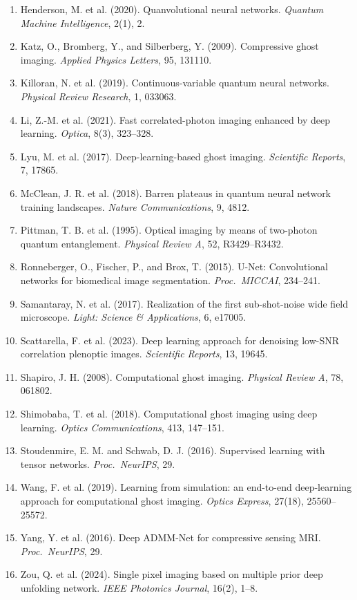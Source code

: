 \documentclass[12pt,a4paper]{article}
\begin{document}
\begin{enumerate}
    \item Henderson, M. et al. (2020). Quanvolutional neural networks. \textit{Quantum Machine Intelligence}, 2(1), 2.
    \item Katz, O., Bromberg, Y., and Silberberg, Y. (2009). Compressive ghost imaging. \textit{Applied Physics Letters}, 95, 131110.
    \item Killoran, N. et al. (2019). Continuous-variable quantum neural networks. \textit{Physical Review Research}, 1, 033063.
    \item Li, Z.-M. et al. (2021). Fast correlated-photon imaging enhanced by deep learning. \textit{Optica}, 8(3), 323--328.
    \item Lyu, M. et al. (2017). Deep-learning-based ghost imaging. \textit{Scientific Reports}, 7, 17865.
    \item McClean, J. R. et al. (2018). Barren plateaus in quantum neural network training landscapes. \textit{Nature Communications}, 9, 4812.
    \item Pittman, T. B. et al. (1995). Optical imaging by means of two-photon quantum entanglement. \textit{Physical Review A}, 52, R3429--R3432.
    \item Ronneberger, O., Fischer, P., and Brox, T. (2015). U-Net: Convolutional networks for biomedical image segmentation. \textit{Proc.\ MICCAI}, 234--241.
    \item Samantaray, N. et al. (2017). Realization of the first sub-shot-noise wide field microscope. \textit{Light: Science \& Applications}, 6, e17005.
    \item Scattarella, F. et al. (2023). Deep learning approach for denoising low-SNR correlation plenoptic images. \textit{Scientific Reports}, 13, 19645.
    \item Shapiro, J. H. (2008). Computational ghost imaging. \textit{Physical Review A}, 78, 061802.
    \item Shimobaba, T. et al. (2018). Computational ghost imaging using deep learning. \textit{Optics Communications}, 413, 147--151.
    \item Stoudenmire, E. M. and Schwab, D. J. (2016). Supervised learning with tensor networks. \textit{Proc.\ NeurIPS}, 29.
    \item Wang, F. et al. (2019). Learning from simulation: an end-to-end deep-learning approach for computational ghost imaging. \textit{Optics Express}, 27(18), 25560--25572.
    \item Yang, Y. et al. (2016). Deep ADMM-Net for compressive sensing MRI. \textit{Proc.\ NeurIPS}, 29.
    \item Zou, Q. et al. (2024). Single pixel imaging based on multiple prior deep unfolding network. \textit{IEEE Photonics Journal}, 16(2), 1--8.
\end{enumerate}
\end{document}
